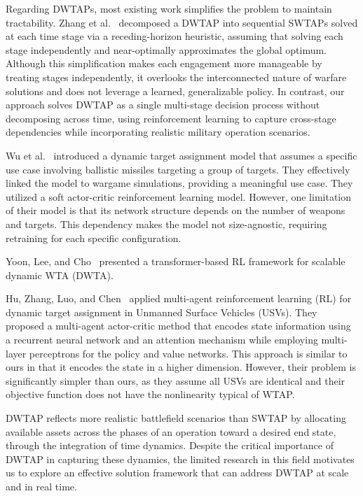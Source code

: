 \documentclass[smallcondensed]{svjour3}
\begin{document}
Regarding DWTAPs, most existing work simplifies the problem to maintain tractability. Zhang et al.~\cite{zhang2020efficient,zhang2020dynamic} decomposed a DWTAP into sequential SWTAPs solved at each time stage via a receding-horizon heuristic, assuming that solving each stage independently and near-optimally approximates the global optimum. Although this simplification makes each engagement more manageable by treating stages independently, it overlooks the interconnected nature of warfare solutions and does not leverage a learned, generalizable policy. In contrast, our approach solves DWTAP as a single multi-stage decision process without decomposing across time, using reinforcement learning to capture cross-stage dependencies while incorporating realistic military operation scenarios.

Wu et al.~\cite{wu2022dynamic} introduced a dynamic target assignment model that assumes a specific use case involving ballistic missiles targeting a group of targets. They effectively linked the model to wargame simulations, providing a meaningful use case. They utilized a soft actor-critic reinforcement learning model. However, one limitation of their model is that its network structure depends on the number of weapons and targets. This dependency makes the model not size-agnostic, requiring retraining for each specific configuration.

Yoon, Lee, and Cho~\cite{yoontransformer} presented a transformer-based RL framework for scalable dynamic WTA (DWTA). %

Hu, Zhang, Luo, and Chen~\cite{hu2024} applied multi-agent reinforcement learning (RL) for dynamic target assignment in Unmanned Surface Vehicles (USVs). They proposed a multi-agent actor-critic method that encodes state information using a recurrent neural network and an attention mechanism while employing multi-layer perceptrons for the policy and value networks. This approach is similar to ours in that it encodes the state in a higher dimension. However, their problem is significantly simpler than ours, as they assume all USVs are identical and their objective function does not have the nonlinearity typical of WTAP.

DWTAP reflects more realistic battlefield scenarios than SWTAP by allocating available assets across the phases of an operation toward a desired end state, through the integration of time dynamics. Despite the critical importance of DWTAP in capturing these dynamics, the limited research in this field motivates us to explore an effective solution framework that can address DWTAP at scale and in real time.
\end{document}
